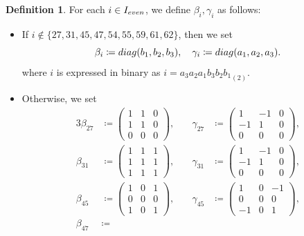 \documentclass{amsart}
\theoremstyle{definition}
\newtheorem{Def}{Definition}[section]
\theoremstyle{plain}
\begin{document}
\begin{Def}\label{hyp_matrix}
For each $i \in I_{\rm even}$, we define $\beta_i,\gamma_i$ as follows:
\begin{itemize}
\item If $i \notin \{27,31,45,47,54,55,59,61,62\}$, then we set
\[
    \beta_i \coloneqq {\rm diag}(b_1,b_2,b_3), \quad \gamma_i \coloneqq {\rm diag}(a_1,a_2,a_3).\smallskip
\]
where $i$ is expressed in binary as $i = {a_3a_2a_1b_3b_2b_1}_{(2)}$.
\item Otherwise, we set
{\small \begin{alignat*}{3}
    \beta_{27} &\coloneqq
        \begin{pmatrix}
            1 & 1 & 0\\
            1 & 1 & 0\\
            0 & 0 & 0
        \end{pmatrix}, &\quad \gamma_{27} &\coloneqq
        \begin{pmatrix}
            1 & -1 & 0\\
            -1 & 1 & 0\\
            0 & 0 & 0
        \end{pmatrix},\\
    \beta_{31} &\coloneqq
        \begin{pmatrix}
            1 & 1 & 1\\
            1 & 1 & 1\\
            1 & 1 & 1
        \end{pmatrix}, &\quad \gamma_{31} &\coloneqq
        \begin{pmatrix}
            1 & -1 & 0\\
            -1 & 1 & 0\\
            0 & 0 & 0
        \end{pmatrix},\\
    \beta_{45} &\coloneqq
        \begin{pmatrix}
            1 & 0 & 1\\
            0 & 0 & 0\\
            1 & 0 & 1
        \end{pmatrix}, &\quad \gamma_{45} &\coloneqq
        \begin{pmatrix}
            1 & 0 & -1\\
            0 & 0 & 0\\
            -1 & 0 & 1
        \end{pmatrix},\\
    \beta_{47} &\coloneqq

\end{alignat*}}
\end{itemize}
\end{Def}
\end{document}
